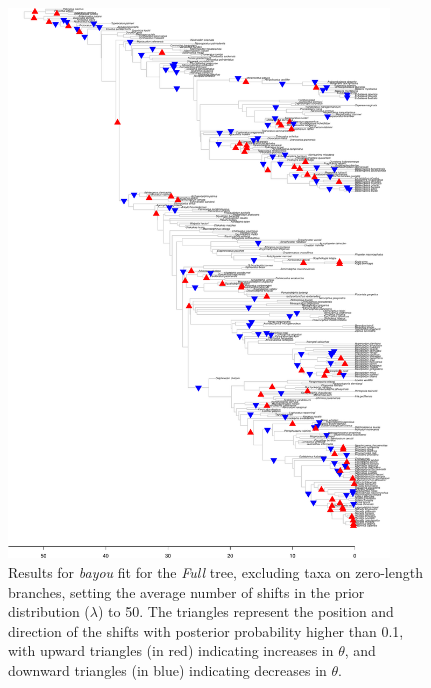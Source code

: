 \begin{figure}[H]
\includegraphics[width=0.9\textwidth]{img/plots-full-k50-1.pdf}
\caption{Results for \textit{bayou} fit for the \textit{Full} tree, excluding taxa on zero-length branches, setting the average number of shifts in the prior distribution ($\lambda$) to 50. The triangles represent the position and direction of the shifts with posterior probability higher than 0.1, with upward triangles (in red) indicating increases in $\theta$, and downward triangles (in blue) indicating decreases in $\theta$.}
\label{fig:full-k50-nzlb}
\end{figure}

\newpage

